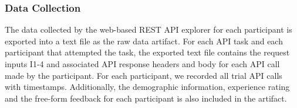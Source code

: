 \subsubsection{Data Collection} %
The data collected by the web-based REST API explorer for each participant is exported into a text file as the raw data artifact. For each API task and each participant that attempted the task, the exported text file contains the request inputs I1-4 and associated API response headers and body for each API call made by the participant. For each participant, we recorded all trial API calls with timestamps. Additionally, the demographic information, experience rating and the free-form feedback for each participant is also included in the artifact.


\pgfplotsset{compat=1.14}
\usetikzlibrary{patterns}
\groupone

